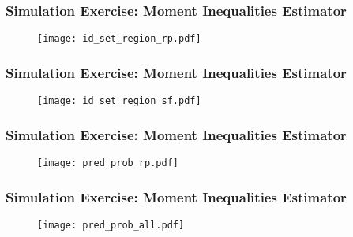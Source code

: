\documentclass[notes=show]{beamer}
\begin{document}
\begin{frame}
\frametitle{Simulation Exercise: Moment Inequalities Estimator}

\begin{figure}[h!]
\centering \texttt{[image: id\_set\_region\_rp.pdf]}
\end{figure}

\end{frame}

\begin{frame}
\frametitle{Simulation Exercise: Moment Inequalities Estimator}

\begin{figure}[h!]
\centering \texttt{[image: id\_set\_region\_sf.pdf]}
\end{figure}

\end{frame}
\begin{frame}
\frametitle{Simulation Exercise: Moment Inequalities Estimator}

\begin{figure}[h!]
\centering \texttt{[image: pred\_prob\_rp.pdf]}
\end{figure}

\end{frame}

\begin{frame}
\frametitle{Simulation Exercise: Moment Inequalities Estimator}

\begin{figure}[h!]
\centering \texttt{[image: pred\_prob\_all.pdf]}
\end{figure}

\end{frame}


\end{document}
